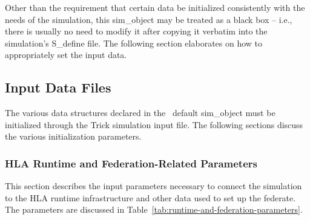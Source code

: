Other than the requirement that certain data be initialized consistently with
the needs of the simulation, this {\ttfamily sim\_object} may be treated as
a black box -- i.e., there is usually no need to modify it after copying it
verbatim into the simulation's {\ttfamily S\_define} file.
The following section elaborates on how to appropriately set the input data.

\subsection{Input Data Files}

The various data structures declared in the \TrickHLA\ default
{\ttfamily sim\_object} must be initialized through the Trick
simulation input file.
The following sections discuss the various initialization parameters.

\subsubsection{HLA Runtime and Federation-Related Parameters}

This section describes the input parameters necessary to connect the
simulation to the HLA runtime infrastructure and other data used to set up
the federate.
The parameters are discussed in Table~\ref{tab:runtime-and-federation-parameters}.

